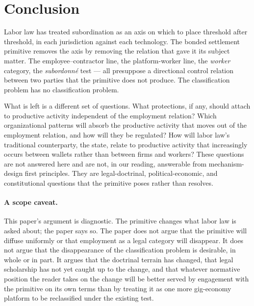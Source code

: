\documentclass[11pt,a4paper]{article}
\theoremstyle{remark}
\begin{document}
\section{Conclusion}
\label{sec:conclusion}

Labor law has treated subordination as an axis on which to place
threshold after threshold, in each jurisdiction against each
technology. The bonded settlement primitive removes the axis by
removing the relation that gave it its subject matter. The
employee--contractor line, the platform-worker line, the \emph{worker}
category, the \emph{subordonné} test --- all presuppose a
directional control relation between two parties that the primitive
does not produce. The classification problem has no classification
problem.

What is left is a different set of questions. What protections, if
any, should attach to productive activity independent of the
employment relation? Which organizational patterns will absorb the
productive activity that moves out of the employment relation, and
how will they be regulated? How will labor law's traditional
counterparty, the state, relate to productive activity that
increasingly occurs between wallets rather than between firms and
workers? These questions are not answered here and are not, in our
reading, answerable from mechanism-design first principles. They
are legal-doctrinal, political-economic, and constitutional
questions that the primitive poses rather than resolves.

\paragraph{A scope caveat.}
This paper's argument is diagnostic. The primitive changes what
labor law is asked about; the paper says so. The paper does not
argue that the primitive will diffuse uniformly or that employment
as a legal category will disappear. It does not argue that the
disappearance of the classification problem is desirable, in whole
or in part. It argues that the doctrinal terrain has changed,
that legal scholarship has not yet caught up to the change, and
that whatever normative position the reader takes on the change
will be better served by engagement with the primitive on its own
terms than by treating it as one more gig-economy platform to be
reclassified under the existing test.
\end{document}
